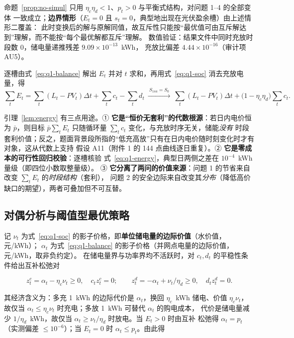命题~\ref{prop:no-simul} 只用 \(\eta_c\eta_d<1\)、\(p_t>0\) 与平衡式结构，对问题 1--4 的全部变体
一致成立；\textbf{边界情形}（\(E_t=0\) 且 \(s_t=0\)，典型地出现在光伏盈余槽）由上述情形二覆盖：
此时变换后的解与原解同值，故互斥性只能按“最优值可由互斥解达到”理解，而不能按“每个最优解都互斥”理解。
数值验证：结果文件中同时充放时段数 0，储电量递推残差 \(9.09\times10^{-13}\)~kWh，
充放比偏差 \(4.44\times10^{-16}\)（审计项 AU5）。

\begin{lemma}[能量恒等式]\label{lem:energy}
逐槽由式~\eqref{eq:q1-balance} 解出 \(E_t\) 并对 \(t\) 求和，再用式~\eqref{eq:q1-soc} 消去充放电量，得
\begin{equation}
  \sum_{t}E_t=\sum_{t}(L_t-PV_t)\Delta t+\sum_{t}c_t-\sum_{t}d_t
  \ \xrightarrow{\ S_{144}=S_0\ }\
  \sum_{t}(L_t-PV_t)\Delta t+\bigl(1-\eta_c\eta_d\bigr)\sum_{t}c_t .
  \label{eq:q1-energy}
\end{equation}
\end{lemma}

引理~\ref{lem:energy} 有三点用途。① \textbf{它是“恒价无套利”的代数根源}：若日内电价恒为
\(\bar p\)，则目标 \(\bar p\sum_tE_t\) 只随循环量 \(\sum_tc_t\) 变化，与充放时序无关，储能\emph{没有}
时段套利价值；反之，题面背景段所指的“低充高放”只有在日内电价随时刻变化时才有对象，这从代数上支持
假设 A11（附件 1 的 144 点曲线逐日重复）。② \textbf{它是零成本的可行性回归校验}：逐槽核验
式~\eqref{eq:q1-energy}，典型日两侧之差在 \(10^{-4}\)~kWh 量级（即四位小数取整量级）。
③ \textbf{它分离了两问的价值来源}：问题 1 的节省来自改变 \(\sum_tE_t\) 的\emph{时段结构}（套利），
问题 2 的安全边际来自改变其\emph{分布}（降低高价缺口的期望），两者可叠加但不可互替。

\subsection{对偶分析与阈值型最优策略}

记 \(\nu_t\) 为式~\eqref{eq:q1-soc} 的影子价格，即\textbf{单位储电量的边际价值}（水价值，元/kWh）；
\(\alpha_t\) 为式~\eqref{eq:q1-balance} 的影子价格（并网点电量的边际价值，元/kWh，取非负约定）。
在储电量界与功率界均不活跃时，对 \(c_t,d_t\) 的平稳性条件给出互补松弛对

\begin{equation}
  z^{c}_t=\alpha_t-\eta_c\nu_t\ge0,\quad c_tz^{c}_t=0;\qquad
  z^{d}_t=-\alpha_t+\nu_t/\eta_d\ge0,\quad d_tz^{d}_t=0 .
  \label{eq:q1-kkt}
\end{equation}

其经济含义为：多充 1~kWh 的边际代价是 \(\alpha_t\)，换回 \(\eta_c\)~kWh 储电、价值
\(\eta_c\nu_t\)，故仅当 \(\alpha_t\le\eta_c\nu_t\) 时充电；多放 1~kWh 可替代 \(\alpha_t\) 的购电成本，
代价是储电量减少 \(1/\eta_d\)~kWh，故仅当 \(\alpha_t\ge\nu_t/\eta_d\) 时放电。当 \(E_t>0\) 时由互补
松弛得 \(\alpha_t=p_t\)（实测偏差 \(\le10^{-6}\)）；当 \(E_t=0\) 时 \(\alpha_t\le p_t\)。由此得

